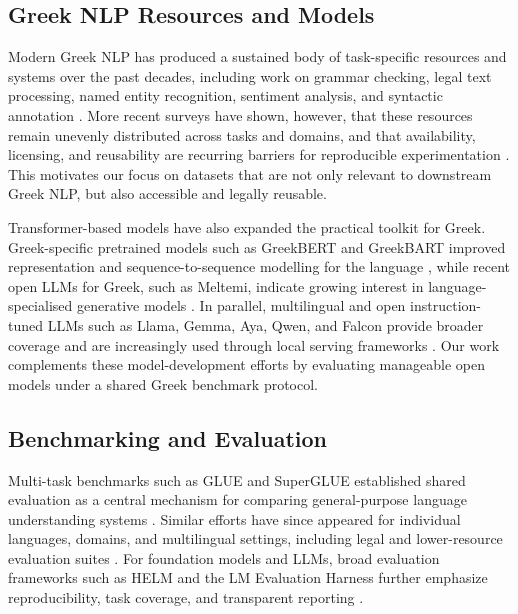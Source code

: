 \documentclass[sigconf,review,anonymous]{acmart}
\begin{document}
\subsection{Greek NLP Resources and Models}
Modern Greek NLP has produced a sustained body of task-specific resources and systems over the past decades, including work on grammar checking, legal text processing, named entity recognition, sentiment analysis, and syntactic annotation \cite{gakis:2017,papaloukas2021,Bartziokas2020,Alexandridis2021Survey,prokopidis2017universal}. More recent surveys have shown, however, that these resources remain unevenly distributed across tasks and domains, and that availability, licensing, and reusability are recurring barriers for reproducible experimentation \cite{Nikiforos2021,bakagianni2025systematic}. This motivates our focus on datasets that are not only relevant to downstream Greek NLP, but also accessible and legally reusable.


Transformer-based models have also expanded the practical toolkit for Greek. Greek-specific pretrained models such as GreekBERT and GreekBART improved representation and sequence-to-sequence modelling for the language \cite{koutsikakis2020,evdaimon2023greekbart}, while recent open LLMs for Greek, such as Meltemi, indicate growing interest in language-specialised generative models \cite{voukoutis2024meltemi}. In parallel, multilingual and open instruction-tuned LLMs such as Llama, Gemma, Aya, Qwen, and Falcon provide broader coverage and are increasingly used through local serving frameworks \cite{grattafiori2024llama,team2024gemma,dang2024aya,yang2024qwen25,almazrouei2023falcon}. Our work complements these model-development efforts by evaluating manageable open models under a shared Greek benchmark protocol.


\subsection{Benchmarking and Evaluation}
Multi-task benchmarks such as GLUE and SuperGLUE established shared evaluation as a central mechanism for comparing general-purpose language understanding systems \cite{wang2019glue,wang2019superglue}. Similar efforts have since appeared for individual languages, domains, and multilingual settings, including legal and lower-resource evaluation suites \cite{chalkidis-etal-2022-lexglue,urbizu2022basqueglue,wilie-etal-2020-indonlu}. For foundation models and LLMs, broad evaluation frameworks such as HELM and the LM Evaluation Harness further emphasize reproducibility, task coverage, and transparent reporting \cite{liang2023helm,gao2023lmeval}.
\end{document}
